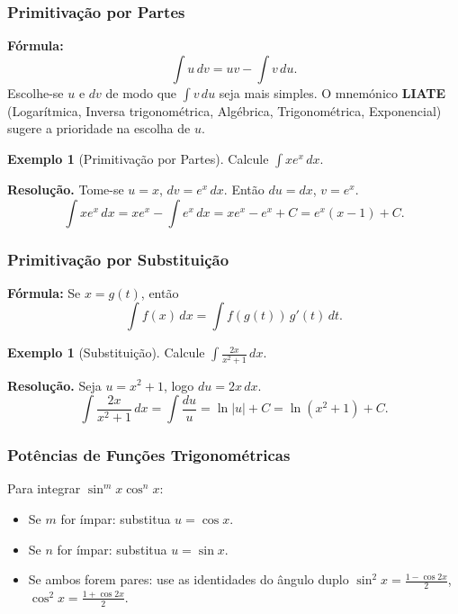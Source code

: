 \documentclass[12pt,a4paper]{article}
\theoremstyle{definition}
\newtheorem{example}[theorem]{Exemplo}
\theoremstyle{remark}
\begin{document}
\subsubsection*{Primitivação por Partes}

\begin{keybox}
\textbf{Fórmula:}
\[
  \int u\,dv = uv - \int v\,du.
\]
Escolhe-se $u$ e $dv$ de modo que $\int v\,du$ seja mais simples. O
mnemónico \textbf{LIATE} (Logarítmica, Inversa trigonométrica, Algébrica,
Trigonométrica, Exponencial) sugere a prioridade na escolha de $u$.
\end{keybox}

\begin{example}[Primitivação por Partes]
  Calcule $\displaystyle\int x e^x\,dx$.

  \textbf{Resolução.} Tome-se $u=x$, $dv=e^x\,dx$. Então $du=dx$, $v=e^x$.
  \[
    \int x e^x\,dx = xe^x - \int e^x\,dx = xe^x - e^x + C = e^x(x-1)+C.
  \]
\end{example}

\subsubsection*{Primitivação por Substituição}

\begin{keybox}
\textbf{Fórmula:} Se $x = g(t)$, então
\[
  \int f(x)\,dx = \int f(g(t))\,g'(t)\,dt.
\]
\end{keybox}

\begin{example}[Substituição]
  Calcule $\displaystyle\int \frac{2x}{x^2+1}\,dx$.

  \textbf{Resolução.} Seja $u = x^2+1$, logo $du = 2x\,dx$.
  \[
    \int \frac{2x}{x^2+1}\,dx = \int \frac{du}{u} = \ln|u|+C = \ln(x^2+1)+C.
  \]
\end{example}

\subsubsection*{Potências de Funções Trigonométricas}

Para integrar $\sin^m x\cos^n x$:
\begin{itemize}[nosep]
  \item Se $m$ for ímpar: substitua $u=\cos x$.
  \item Se $n$ for ímpar: substitua $u=\sin x$.
  \item Se ambos forem pares: use as identidades do ângulo duplo
        $\sin^2 x = \tfrac{1-\cos 2x}{2}$,
        $\cos^2 x = \tfrac{1+\cos 2x}{2}$.
\end{itemize}
\end{document}
